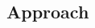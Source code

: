 \documentclass{nihgrant}
\begin{document}

\cleardoublepage


\cleardoublepage
\begin{multicols}{2}



\section{Approach}





\end{multicols}


\clearpage

\printbibliography
\end{document}

